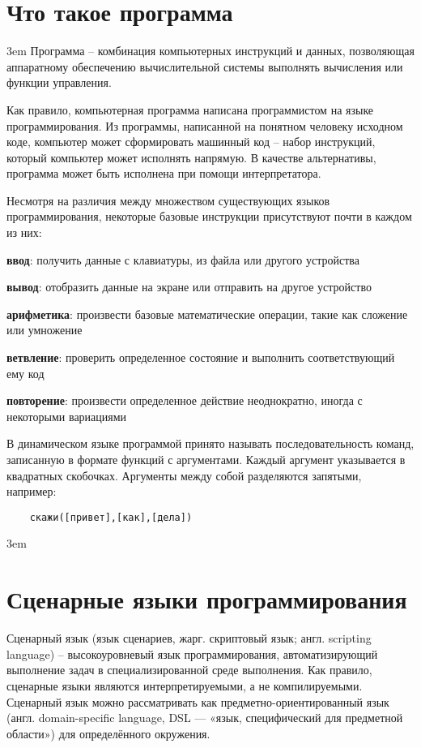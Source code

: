\documentclass[../index.tex]{subfiles}
\begin{document}
\section{Что такое программа}
   \emergencystretch 3em
    Программа -- комбинация компьютерных инструкций и данных, позволяющая аппаратному обеспечению вычислительной системы выполнять вычисления или функции управления. 
    
    Как правило, компьютерная программа написана программистом на языке программирования. Из программы, написанной на понятном человеку исходном коде, компьютер может сформировать машинный код -- набор инструкций, который компьютер может исполнять напрямую. В качестве альтернативы, программа может быть исполнена при помощи интерпретатора.
    
    Несмотря на различия между множеством существующих языков программирования, некоторые базовые инструкции присутствуют почти в каждом из них:
    
    \textbf{ввод}: получить данные с клавиатуры, из файла или другого устройства
    
    \textbf{вывод}: отобразить данные на экране или отправить на другое устройство
    
    \textbf{арифметика}: произвести базовые математические операции, такие как сложение или умножение
    
    \textbf{ветвление}: проверить определенное состояние и выполнить соответствующий ему код
    
    \textbf{повторение}: произвести определенное действие неоднократно, иногда с некоторыми вариациями
        
        
    В динамическом языке программой принято называть последовательность команд, записанную в формате функций с аргументами.
    Каждый аргумент указывается в квадратных скобочках. Аргументы между собой разделяются запятыми, например: 
    \begin{verbatim}
    скажи([привет],[как],[дела])
    \end{verbatim}
    
     \emergencystretch 3em
    \section{Сценарные языки программирования}
        Сценарный язык (язык сценариев, жарг. скриптовый язык; англ. scripting language) -- высокоуровневый язык программирования, автоматизирующий выполнение задач в специализированной среде выполнения. 
        Как правило, сценарные языки являются интерпретируемыми, а не компилируемыми. Сценарный язык 
        можно рассматривать как предметно-ориентированный язык (англ. domain-specific language, DSL — «язык, специфический для предметной области») для определённого окружения.
        
\end{document}
